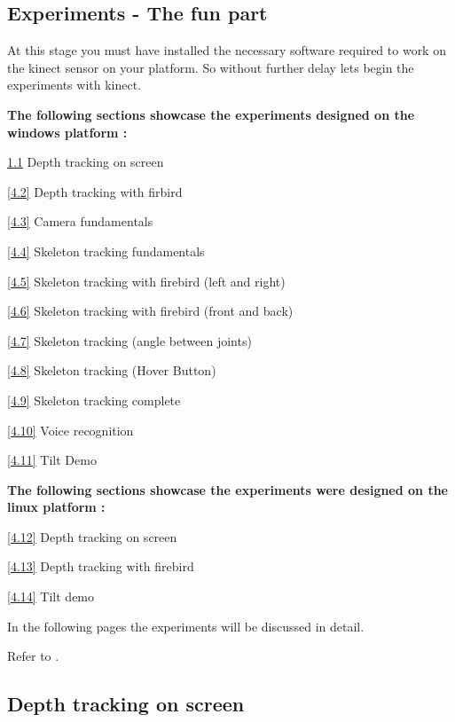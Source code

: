 

\begin{flushleft}

\chapter{Experiments - The fun part}

At this stage you must have installed the necessary software required to work on the kinect sensor on your platform. So without further delay lets begin the experiments with kinect.
\medskip

\textbf{The following sections showcase the experiments designed on the windows platform :}

\ref{4.1} Depth tracking on screen

\ref{4.2} Depth tracking with firbird

\ref{4.3} Camera fundamentals

\ref{4.4} Skeleton tracking fundamentals

\ref{4.5} Skeleton tracking with firebird (left and right)

\ref{4.6} Skeleton tracking with firebird (front and back)

\ref{4.7} Skeleton tracking (angle between joints)

\ref{4.8} Skeleton tracking (Hover Button)

\ref{4.9} Skeleton tracking complete

\ref{4.10} Voice recognition

\ref{4.11} Tilt Demo

\medskip

\textbf{The following sections showcase the experiments were designed on the linux platform :}

\ref{4.12} Depth tracking on screen

\ref{4.13} Depth tracking with firebird

\ref{4.14} Tilt demo

\medskip

In the following pages the experiments will be discussed in detail.

Refer to \cite{skeleton1} \cite{video} \cite{serial} \cite{skeleton2} \cite{skeleton3} \cite{skeleton4} \cite{audio1} \cite{audio2}.
\newpage

\medskip
\section{\textbf{ Depth tracking on screen}}
\label{4.1}


\end{flushleft}
